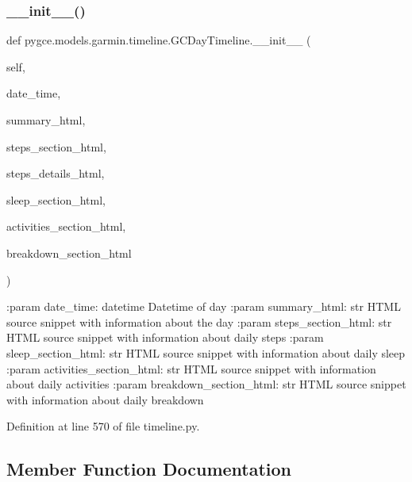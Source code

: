 \subsubsection{\texorpdfstring{\+\_\+\+\_\+init\+\_\+\+\_\+()}{\_\_init\_\_()}}
{\footnotesize\ttfamily def pygce.\+models.\+garmin.\+timeline.\+G\+C\+Day\+Timeline.\+\_\+\+\_\+init\+\_\+\+\_\+ (\begin{DoxyParamCaption}\item[{}]{self,  }\item[{}]{date\+\_\+time,  }\item[{}]{summary\+\_\+html,  }\item[{}]{steps\+\_\+section\+\_\+html,  }\item[{}]{steps\+\_\+details\+\_\+html,  }\item[{}]{sleep\+\_\+section\+\_\+html,  }\item[{}]{activities\+\_\+section\+\_\+html,  }\item[{}]{breakdown\+\_\+section\+\_\+html }\end{DoxyParamCaption})}

\begin{DoxyVerb}:param date_time: datetime
    Datetime of day
:param summary_html: str
    HTML source snippet with information about the day
:param steps_section_html: str
    HTML source snippet with information about daily steps
:param sleep_section_html: str
    HTML source snippet with information about daily sleep
:param activities_section_html: str
    HTML source snippet with information about daily activities
:param breakdown_section_html: str
    HTML source snippet with information about daily breakdown
\end{DoxyVerb}
 

Definition at line 570 of file timeline.\+py.



\subsection{Member Function Documentation}
\mbox{\label{classpygce_1_1models_1_1garmin_1_1timeline_1_1_g_c_day_timeline_ae2d3f754907b22c3a87715fa8664cb5d}} 

